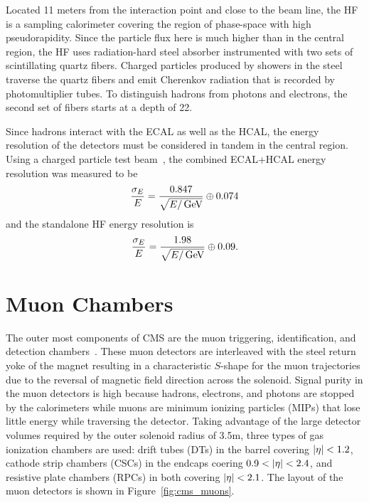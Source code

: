 Located 11 meters from the interaction point and close to the beam line, the HF is a sampling calorimeter covering the region of  phase-space with high pseudorapidity.
Since the particle flux here is much higher than in the central region, the HF uses radiation-hard steel absorber instrumented with two sets of scintillating quartz fibers.
Charged particles produced by showers in the steel traverse the quartz fibers and emit Cherenkov radiation that is recorded by photomultiplier tubes.
To distinguish hadrons from photons and electrons, the second set of fibers starts at a depth of 22\cm.

Since hadrons interact with the ECAL as well as the HCAL, the energy resolution of the detectors must be considered in tandem in the central region.
Using a charged particle test beam~\cite{CMS2008}, the combined ECAL+HCAL energy resolution was measured to be
\begin{equation}
   \frac{\sigma_E}{E} = \frac{0.847}{\sqrt{E/\,\text{Ge\hspace{-.08em}V}}} \oplus 0.074
\end{equation}
and the standalone HF energy resolution is
\begin{equation}
   \frac{\sigma_E}{E} = \frac{1.98}{\sqrt{E/\,\text{Ge\hspace{-.08em}V}}} \oplus 0.09.
\end{equation}

\section{Muon Chambers}

The outer most components of CMS are the muon triggering, identification, and detection chambers~\cite{CMS2008}.
These muon detectors are interleaved with the steel return yoke of the magnet resulting in a characteristic $S$-shape for the muon trajectories due to the reversal of magnetic field direction across the solenoid.
Signal purity in the muon detectors is high because hadrons, electrons, and photons are stopped by the calorimeters while muons are minimum ionizing particles (MIPs) that lose little energy while traversing the detector.
Taking advantage of the large detector volumes required by the outer solenoid radius of 3.5\unit{m}, three types of gas ionization chambers are used: drift tubes (DTs) in the barrel covering $\lvert \eta \rvert < 1.2$, cathode strip chambers (CSCs) in the endcaps coering $0.9 < \lvert \eta \rvert < 2.4$, and resistive plate chambers (RPCs) in both covering $\lvert \eta \rvert < 2.1$.
The layout of the muon detectors is shown in Figure~\ref{fig:cms_muons}.

